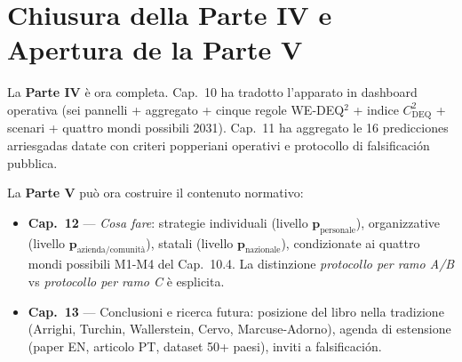 \section{Chiusura della Parte IV e Apertura de la Parte
V}\label{chiusura-della-parte-iv-e-apertura-della-parte-v}

La \textbf{Parte IV} è ora completa. Cap.~10 ha tradotto l'apparato in
dashboard operativa (sei pannelli + aggregato + cinque regole WE-DEQ$^2$ +
indice \(C_{\text{DEQ}}^2\) + scenari + quattro mondi possibili 2031).
Cap.~11 ha aggregato le 16 predicciones arriesgadas datate con criteri
popperiani operativi e protocollo di falsificación pubblica.

La \textbf{Parte V} può ora costruire il contenuto normativo:

\begin{itemize}
\tightlist
\item
  \textbf{Cap.~12} --- \emph{Cosa fare}: strategie individuali (livello
  \(\boldsymbol{p}_{\text{personale}}\)), organizzative (livello
  \(\boldsymbol{p}_{\text{azienda/comunità}}\)), statali (livello
  \(\boldsymbol{p}_{\text{nazionale}}\)), condizionate ai quattro mondi
  possibili M1-M4 del Cap.~10.4. La distinzione \emph{protocollo per
  ramo A/B} vs \emph{protocollo per ramo C} è esplicita.
\item
  \textbf{Cap.~13} --- Conclusioni e ricerca futura: posizione del libro
  nella tradizione (Arrighi, Turchin, Wallerstein, Cervo,
  Marcuse-Adorno), agenda di estensione (paper EN, articolo PT, dataset
  50+ paesi), inviti a falsificación.
\end{itemize}


